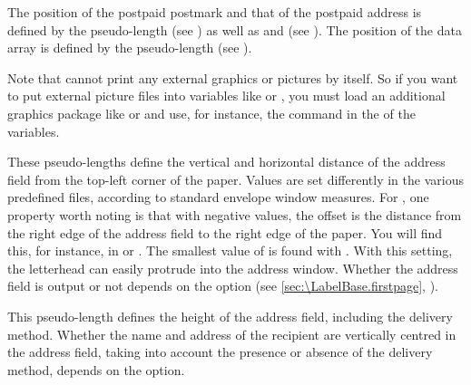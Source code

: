 The position of the postpaid postmark and that of the
postpaid address is defined by the  pseudo-length (see
) as well as
 and  (see
). The position of
the data array is defined by the  pseudo-length
(see ).

Note that \KOMAScript{} cannot print any external
graphics or pictures by itself. So if you want to put external picture files
into variables like  or , you
must load an additional graphics package like
 or
 and use, for instance, the
 command in the  of the variables.%
%
\EndIndexGroup


\begin{Declaration}
\end{Declaration}
These pseudo-lengths define the vertical and horizontal distance of the
address field from the top-left corner of the paper. Values are set
differently in the various predefined  files, according to standard envelope window
measures. For , one property worth noting is that with
negative values, the offset is the distance from the right edge of the address
field to the right edge of the paper. You will find this, for instance, in
 or . The smallest value of  is
found with . With this setting, the letterhead can easily
protrude into the address window. Whether the address field is output or not
depends on the  option (see
\autoref{sec:\LabelBase.firstpage}, ).%
\EndIndexGroup


\begin{Declaration}
\end{Declaration}
This pseudo-length defines the height of the address field, including the
delivery method. Whether the name and address of the recipient are vertically
centred in the address field, taking into account the presence or absence of
the delivery method, depends on the 
option.%
\EndIndexGroup


